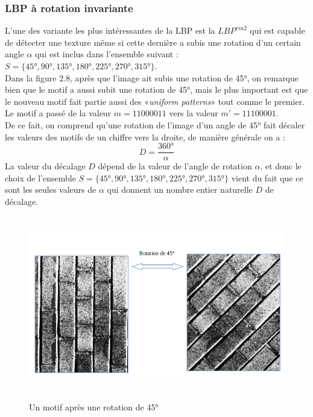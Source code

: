 \subsubsection{LBP à rotation invariante }
\indent L'une des variante les plus intéressantes de la LBP est la $LBP^{riu2}$ qui est capable de détecter une texture même si cette dernière a subis une rotation d'un certain angle $\alpha$ qui est inclus dans l'ensemble suivant : $S = \lbrace 45\si{\degree}, 90\si{\degree}, 135\si{\degree}, 180\si{\degree}, 225\si{\degree}, 270\si{\degree}, 315\si{\degree} \rbrace$.\\

\indent Dans la figure 2.8, après que l'image ait subis une rotation de 45$\si{\degree}$, on remarque bien que le motif a aussi subit une rotation de 45$\si{\degree}$, mais le plus important est que le nouveau motif fait partie aussi des «\textit{uniform patterns}» tout comme le premier. 
Le motif a passé de la valeur $m=11000011$ vers la valeur $m'=11100001$.\\
De ce fait, on comprend qu'une rotation de l'image d'un angle de 45$\si{\degree}$ fait décaler les valeurs des motifs de un chiffre vers la droite, de manière générale on a :
$$ D = \frac{360\si{\degree}}{\alpha} $$
\indent La valeur du décalage $D$ dépend de la valeur de l'angle de rotation $\alpha$, et donc le choix de l'ensemble $S = \lbrace 45\si{\degree}, 90\si{\degree}, 135\si{\degree}, 180\si{\degree}, 225\si{\degree}, 270\si{\degree}, 315\si{\degree} \rbrace$ vient du fait que ce sont les seules valeurs de $\alpha$ qui donnent un nombre entier naturelle $D$ de décalage.


\begin{figure}[H]
	\centering
		\includegraphics[width=14cm,height=8cm]{Figures/chap2/rotation45.png}
	\caption[rot1]{Un motif après une rotation de 45$\si{\degree}$}
\end{figure}


